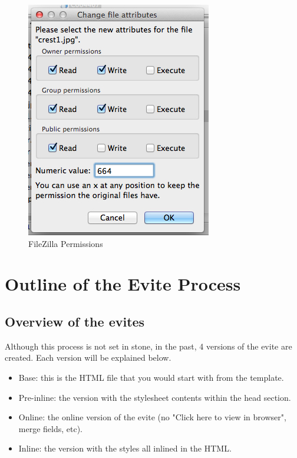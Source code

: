 \documentclass[a4paper,11pt]{article}
\begin{document}
\begin{itemize}
		\begin{figure}[ht]
		\centering
		\includegraphics[width=.5\textwidth]{images/fig3}
		\caption{FileZilla Permissions}
		\label{fig:One}
		\end{figure}
	\end{itemize}
	
	\section{Outline of the Evite Process}
	\subsection{Overview of the evites}
	Although this process is not set in stone, in the past, 4 versions of the evite are created. Each version will be explained below.
	\begin{itemize}
		\item Base: this is the HTML file that you would start with from the template.
		\item Pre-inline: the version with the stylesheet contents within the head section.
		\item Online: the online version of the evite (no "Click here to view in browser", merge fields, etc). 
		\item Inline: the version with the styles all inlined in the HTML.
	\end{itemize}
	
\end{document}
